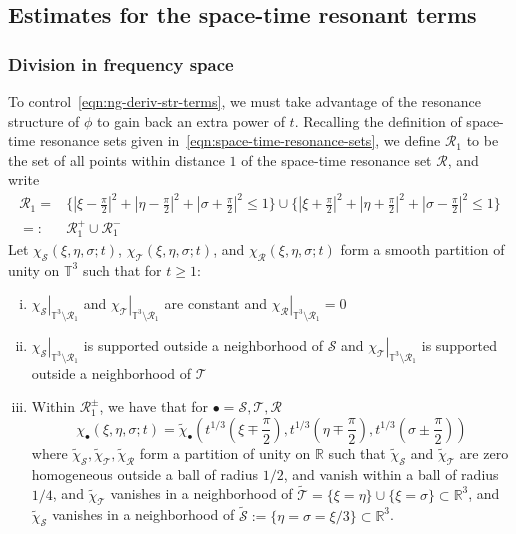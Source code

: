\documentclass[letterpaper, reqno,final]{amsart}
\newcommand{\bbR}{\mathbb{R}}
\newcommand{\bbT}{\mathbb{T}}
\newcommand{\cS}{\mathcal{S}}
\newcommand{\cT}{\mathcal{T}}
\newcommand{\cR}{\mathcal{R}}
\newcommand{\fhPi}{\frac{\pi}{2}}
\begin{document}
	
\subsection{\label{sec:weighted-l2-str}Estimates for the space-time resonant terms}
\subsubsection{Division in frequency space} 

To control~\eqref{eqn:ng-deriv-str-terms}, we must take advantage of the resonance structure of $\phi$ to gain back an extra power of $t$.  Recalling the definition of space-time resonance sets given in~\eqref{eqn:space-time-resonance-sets}, we define $\cR_1$ to be the set of all points within distance $1$ of the space-time resonance set $\cR$, and write
\begin{equation*}\begin{split}
    \cR_1 =& \{|\xi - \fhPi|^2 + |\eta - \fhPi|^2 +|\sigma + \fhPi|^2 \leq 1\} \cup \{|\xi + \fhPi|^2 + |\eta + \fhPi|^2 +|\sigma - \fhPi|^2 \leq 1\}\\
    =:& \cR_1^+ \cup \cR_1^-
\end{split}\end{equation*}
Let $\chi_\mathcal{S}(\xi,\eta,\sigma;t)$, $\chi_\mathcal{T}(\xi,\eta,\sigma;t)$, and $\chi_\mathcal{R}(\xi,\eta,\sigma;t)$ form a smooth partition of unity on $\bbT^3$ such that for $t \geq 1$:
\begin{enumerate}[(i)]
    \item $\left.\chi_\cS\right|_{\bbT^3 \setminus \cR_1}$ and $\left.\chi_\cT\right|_{\bbT^3 \setminus \cR_1}$ are constant and $\left.\chi_\cR\right|_{\bbT^3 \setminus \cR_1} = 0$
    \item $\left.\chi_\cS\right|_{\bbT^3 \setminus \cR_1}$ is supported outside a neighborhood of $\cS$ and $\left.\chi_\cT\right|_{\bbT^3 \setminus \cR_1}$ is supported outside a neighborhood of $\cT$
    \item Within $\cR_1^{\pm}$, we have that for $\bullet = \cS, \cT, \cR$ 
    \begin{equation*}
        \chi_\bullet(\xi,\eta,\sigma; t) = \tilde{\chi}_\bullet(t^{1/3}(\xi \mp \fhPi),t^{1/3}(\eta \mp \fhPi), t^{1/3}(\sigma \pm \fhPi))
    \end{equation*}
    where $\tilde{\chi}_\cS, \tilde{\chi}_\cT, \tilde{\chi}_\cR$ form a partition of unity on $\bbR$ such that $\tilde{\chi}_\cS$ and $\tilde{\chi}_\cT$ are zero homogeneous outside a ball of radius $1/2$, and vanish within a ball of radius $1/4$, and $\tilde\chi_{\cT}$ vanishes in a neighborhood of $\tilde{\cT} = \{\xi = \eta\}\cup\{\xi = \sigma\} \subset \bbR^3$, and $\tilde\chi_\cS$ vanishes in a neighborhood of $\tilde{\cS} := \{\eta = \sigma = \xi/3\} \subset \bbR^3$.
\end{enumerate}
\end{document}
